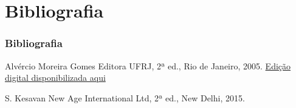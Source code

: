 \section{Bibliografia}

\begin{frame}\frametitle{Bibliografia}

\begin{thebibliography}{}
\beamertemplatebookbibitems
{}
Alvércio Moreira Gomes
\newblock Editora UFRJ, 2ª ed., Rio de Janeiro, 2005.
\newblock \href{https://www.im.ufrj.br/index.php/pt/estrutura/editora-im/matematica/1931-semigrupos-de-operadores-lineares-e-aplicacoes-as-equacoes-de-evolucao}{Edição digital disponibilizada aqui}

S. Kesavan
\newblock New Age International Ltd, 2ª ed., New Delhi, 2015.

\end{thebibliography}

\end{frame}



